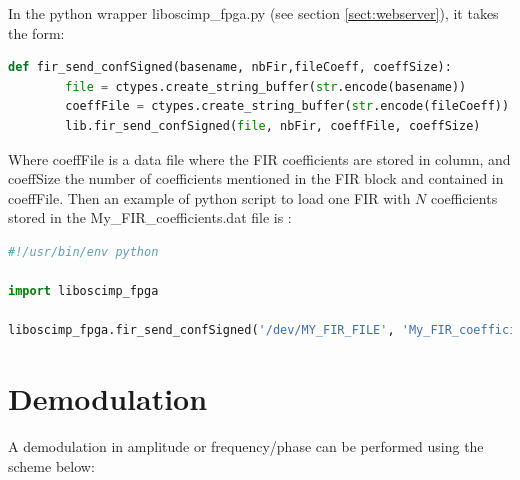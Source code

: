 \documentclass[12pt,oneside]{article}
\begin{document}
In the python wrapper liboscimp\_fpga.py (see section \ref{sect:webserver}), it takes the form:

\vspace{-0cm}
\begin{lstlisting}[language=Python]
def fir_send_confSigned(basename, nbFir,fileCoeff, coeffSize):
		file = ctypes.create_string_buffer(str.encode(basename))
		coeffFile = ctypes.create_string_buffer(str.encode(fileCoeff))
		lib.fir_send_confSigned(file, nbFir, coeffFile, coeffSize)
\end{lstlisting}
\vspace{0.6cm}

Where coeffFile is a data file where the FIR coefficients are stored in column, and coeffSize the number of coefficients mentioned in the FIR block and contained in coeffFile.
Then an example of python script to load one FIR with $N$ coefficients stored in the My\_FIR\_coefficients.dat file is :
\vspace{+0.8cm}
\begin{lstlisting}[language=Python]
#!/usr/bin/env python

import liboscimp_fpga

liboscimp_fpga.fir_send_confSigned('/dev/MY_FIR_FILE', 'My_FIR_coefficients.dat', N)
\end{lstlisting}
\vspace{0.5cm}

\section{Demodulation}\label{sect:demod}

A demodulation in amplitude or frequency/phase can be performed using the scheme below: 
\end{document}
